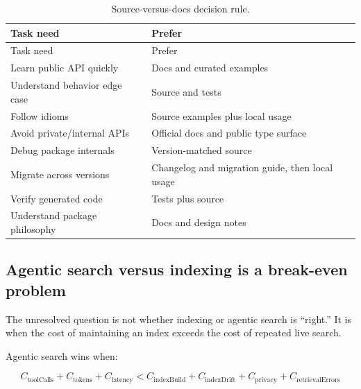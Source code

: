 \documentclass[
  11pt,
  letterpaper,
  numbers=noendperiod,
  parskip=half]{scrartcl}
\begin{document}
\begin{longtable}[]{@{}
  >{\raggedright\arraybackslash}p{}
  >{\raggedright\arraybackslash}p{}@{}}
\caption{Source-versus-docs decision
rule.}\label{tbl-source-docs}\tabularnewline
\toprule\noalign{}
\begin{minipage}[b]{\linewidth}\raggedright
Task need
\end{minipage} & \begin{minipage}[b]{\linewidth}\raggedright
Prefer
\end{minipage} \\
\midrule\noalign{}
\endfirsthead
\toprule\noalign{}
\begin{minipage}[b]{\linewidth}\raggedright
Task need
\end{minipage} & \begin{minipage}[b]{\linewidth}\raggedright
Prefer
\end{minipage} \\
\midrule\noalign{}
\endhead
\bottomrule\noalign{}
\endlastfoot
Learn public API quickly & Docs and curated examples \\
Understand behavior edge case & Source and tests \\
Follow idioms & Source examples plus local usage \\
Avoid private/internal APIs & Official docs and public type surface \\
Debug package internals & Version-matched source \\
Migrate across versions & Changelog and migration guide, then local
usage \\
Verify generated code & Tests plus source \\
Understand package philosophy & Docs and design notes \\
\end{longtable}

\subsection{Agentic search versus indexing is a break-even
problem}\label{sec-break-even}

The unresolved question is not whether indexing or agentic search is
``right.'' It is when the cost of maintaining an index exceeds the cost
of repeated live search.

Agentic search wins when:

\[
C_\mathrm{toolCalls} + C_\mathrm{tokens} + C_\mathrm{latency}
<
C_\mathrm{indexBuild} + C_\mathrm{indexDrift} + C_\mathrm{privacy}
+ C_\mathrm{retrievalErrors}
\]
\end{document}
